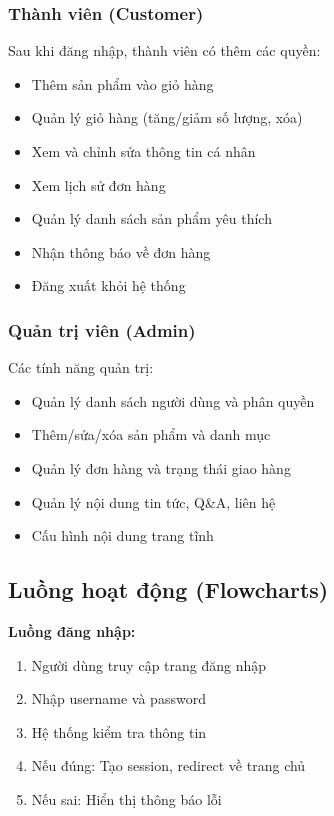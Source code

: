 \subsubsection{Thành viên (Customer)}

Sau khi đăng nhập, thành viên có thêm các quyền:
\begin{itemize}
    \item Thêm sản phẩm vào giỏ hàng
    \item Quản lý giỏ hàng (tăng/giảm số lượng, xóa)
    \item Xem và chỉnh sửa thông tin cá nhân
    \item Xem lịch sử đơn hàng
    \item Quản lý danh sách sản phẩm yêu thích
    \item Nhận thông báo về đơn hàng
    \item Đăng xuất khỏi hệ thống
\end{itemize}

\subsubsection{Quản trị viên (Admin)}

Các tính năng quản trị:
\begin{itemize}
    \item Quản lý danh sách người dùng và phân quyền
    \item Thêm/sửa/xóa sản phẩm và danh mục
    \item Quản lý đơn hàng và trạng thái giao hàng
    \item Quản lý nội dung tin tức, Q\&A, liên hệ
    \item Cấu hình nội dung trang tĩnh
\end{itemize}

\subsection{Luồng hoạt động (Flowcharts)}

\textbf{Luồng đăng nhập:}
\begin{enumerate}
    \item Người dùng truy cập trang đăng nhập
    \item Nhập username và password
    \item Hệ thống kiểm tra thông tin
    \item Nếu đúng: Tạo session, redirect về trang chủ
    \item Nếu sai: Hiển thị thông báo lỗi
\end{enumerate}

